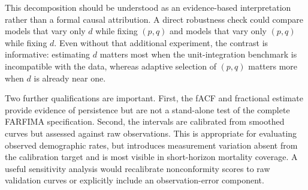 This decomposition should be understood as an evidence-based interpretation rather than a formal causal attribution. A direct robustness check could compare models that vary only $d$ while fixing $(p,q)$ and models that vary only $(p,q)$ while fixing $d$. Even without that additional experiment, the contrast is informative: estimating $d$ matters most when the unit-integration benchmark is incompatible with the data, whereas adaptive selection of $(p,q)$ matters more when $d$ is already near one.

Two further qualifications are important. First, the fACF and fractional estimate provide evidence of persistence but are not a stand-alone test of the complete FARFIMA specification. Second, the intervals are calibrated from smoothed curves but assessed against raw observations. This is appropriate for evaluating observed demographic rates, but introduces measurement variation absent from the calibration target and is most visible in short-horizon mortality coverage. A useful sensitivity analysis would recalibrate nonconformity scores to raw validation curves or explicitly include an observation-error component.
